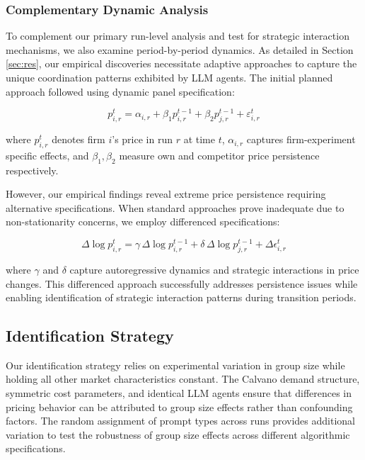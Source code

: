 \subsubsection*{Complementary Dynamic Analysis}

To complement our primary run-level analysis and test for strategic interaction mechanisms, we also examine period-by-period dynamics. As detailed in Section \ref{sec:res}, our empirical discoveries necessitate adaptive approaches to capture the unique coordination patterns exhibited by LLM agents. The initial planned approach followed \textcite{fish_algorithmic_2025} using dynamic panel specification:

\begin{equation}\label{eq:dynamic_panel}
    p_{i,r}^t = \alpha_{i,r} + \beta_1 p_{i,r}^{t-1} + \beta_2 p_{j,r}^{t-1} + \varepsilon_{i,r}^t
\end{equation}

where $p_{i,r}^t$ denotes firm $i$'s price in run $r$ at time $t$, $\alpha_{i,r}$ captures firm-experiment specific effects, and $\beta_1, \beta_2$ measure own and competitor price persistence respectively.

However, our empirical findings reveal extreme price persistence requiring alternative specifications. When standard approaches prove inadequate due to non-stationarity concerns, we employ differenced specifications:

\begin{equation}\label{eq:differenced_fe}
    \Delta \log p_{i,r}^{t} = \gamma \, \Delta \log p_{i,r}^{t-1} + \delta \, \Delta \log p_{j,r}^{t-1} + \Delta \epsilon_{i,r}^t
\end{equation}

where $\gamma$ and $\delta$ capture autoregressive dynamics and strategic interactions in price changes. This differenced approach successfully addresses persistence issues while enabling identification of strategic interaction patterns during transition periods.

\subsection{Identification Strategy}

Our identification strategy relies on experimental variation in group size while holding all other market characteristics constant. The Calvano demand structure, symmetric cost parameters, and identical LLM agents ensure that differences in pricing behavior can be attributed to group size effects rather than confounding factors. The random assignment of prompt types across runs provides additional variation to test the robustness of group size effects across different algorithmic specifications.

